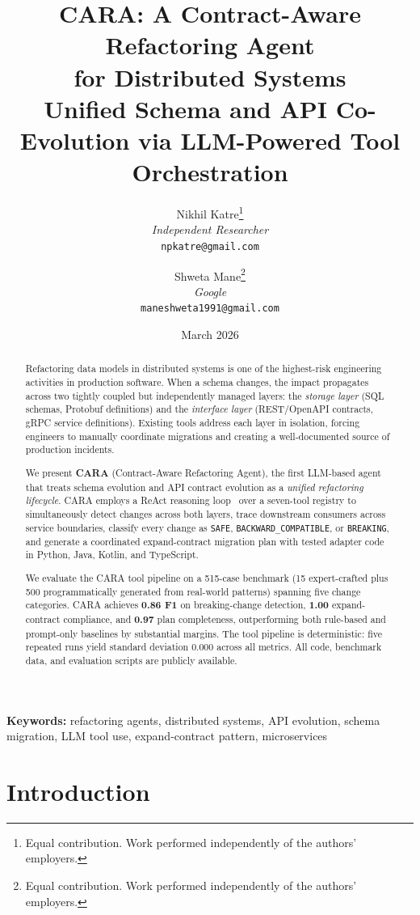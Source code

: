 \documentclass[10pt,twocolumn]{article}
\title{%
  \textbf{CARA: A Contract-Aware Refactoring Agent\\for Distributed Systems}\\[0.4em]
  {\large Unified Schema and API Co-Evolution via LLM-Powered Tool Orchestration}%
}
\author{%
  Nikhil Katre\thanks{Equal contribution. Work performed independently of the authors' employers.}\\
  \textit{Independent Researcher}\\
  \texttt{npkatre@gmail.com}
  \and
  Shweta Mane\thanks{Equal contribution. Work performed independently of the authors' employers.}\\
  \textit{Google}\\
  \texttt{maneshweta1991@gmail.com}%
}
\date{March 2026}
\begin{document}
\maketitle

\begin{abstract}
Refactoring data models in distributed systems is one of the highest-risk
engineering activities in production software. When a schema changes, the
impact propagates across two tightly coupled but independently managed layers:
the \emph{storage layer} (SQL schemas, Protobuf definitions) and the
\emph{interface layer} (REST/OpenAPI contracts, gRPC service definitions).
Existing tools address each layer in isolation, forcing engineers to manually
coordinate migrations and creating a well-documented source of production incidents.

We present \textbf{CARA} (Contract-Aware Refactoring Agent), the first LLM-based
agent that treats schema evolution and API contract evolution as a \emph{unified
refactoring lifecycle}. CARA employs a ReAct reasoning loop~\cite{yao2023react}
over a seven-tool registry to simultaneously detect changes across both layers,
trace downstream consumers across service boundaries, classify every change as
\texttt{SAFE}, \texttt{BACKWARD\_COMPATIBLE}, or \texttt{BREAKING}, and generate
a coordinated expand-contract migration plan with tested adapter code in Python,
Java, Kotlin, and TypeScript.

We evaluate the CARA tool pipeline on a 515-case benchmark (15 expert-crafted
plus 500 programmatically generated from real-world patterns) spanning five
change categories. CARA achieves \textbf{0.86 F1} on breaking-change
detection, \textbf{1.00} expand-contract compliance, and \textbf{0.97} plan
completeness, outperforming both rule-based and prompt-only baselines by
substantial margins. The tool pipeline is deterministic: five repeated runs
yield standard deviation 0.000 across all metrics. All code, benchmark data,
and evaluation scripts are publicly available.
\end{abstract}

\noindent\textbf{Keywords:} refactoring agents, distributed systems, API evolution,
schema migration, LLM tool use, expand-contract pattern, microservices

\section{Introduction}
\end{document}
